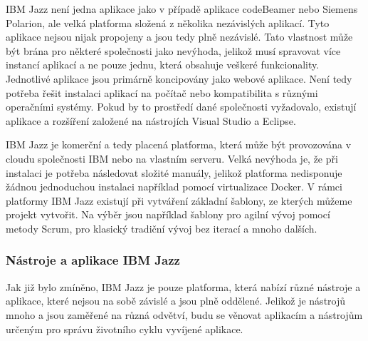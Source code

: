 \documentclass[czech,master,public,dept460,male,cpdeclaration,oneside]{diploma}
\begin{document}
IBM Jazz není jedna aplikace jako v případě aplikace codeBeamer nebo Siemens Polarion, ale velká platforma složená z několika nezávislých aplikací. Tyto aplikace nejsou nijak propojeny a jsou tedy plně nezávislé. Tato vlastnost může být brána pro některé společnosti jako nevýhoda, jelikož musí spravovat více instancí aplikací a ne pouze jednu, která obsahuje veškeré funkcionality. Jednotlivé aplikace jsou primárně koncipovány jako webové aplikace. Není tedy potřeba řešit instalaci aplikací na počítač nebo kompatibilita s různými operačními systémy. Pokud by to prostředí dané společnosti vyžadovalo, existují aplikace a rozšíření založené na nástrojích Visual Studio a Eclipse.

IBM Jazz je komerční a tedy placená platforma, která může být provozována v cloudu společnosti IBM nebo na vlastním serveru. Velká nevýhoda je, že při instalaci je potřeba následovat složité manuály, jelikož platforma nedisponuje žádnou jednoduchou instalaci například pomocí virtualizace Docker. V rámci platformy IBM Jazz existují při vytváření základní šablony, ze kterých můžeme projekt vytvořit.  Na výběr jsou například šablony pro agilní vývoj pomocí metody Scrum, pro klasický tradiční vývoj bez iterací a mnoho dalších. 


\subsubsection{Nástroje a aplikace IBM Jazz}
Jak již bylo zmíněno, IBM Jazz je pouze platforma, která nabízí různé nástroje a aplikace, které nejsou na sobě závislé a jsou plně oddělené. Jelikož je nástrojů mnoho a jsou zaměřené na různá odvětví, budu se věnovat aplikacím a nástrojům určeným pro správu životního cyklu vyvíjené aplikace. \cite{ref:jazz_products}
\end{document}
